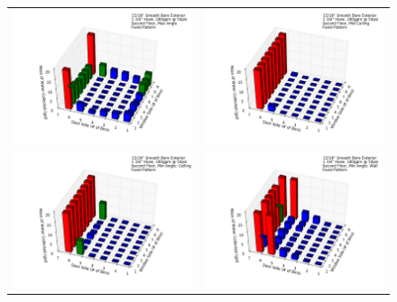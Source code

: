\documentclass{article}
\begin{document}
\begin{figure}[ht]
\begin{tabular*}{\textwidth}{lr}
\includegraphics[width=3.2in]{../ADD_Analysis/Figures/15-12-07_111118_Datafile_15_16in_Smooth_Bore_Exterior.png} &
\includegraphics[width=3.2in]{../ADD_Analysis/Figures/15-12-07_122135_Datafile_15_16in_Smooth_Bore_Exterior.png} \\
\includegraphics[width=3.2in]{../ADD_Analysis/Figures/15-12-07_140034_Datafile_15_16in_Smooth_Bore_Exterior.png} &
\includegraphics[width=3.2in]{../ADD_Analysis/Figures/15-12-07_141333_Datafile_15_16in_Smooth_Bore_Exterior.png} \\

\end{tabular*}
\end{figure}
\end{document}

